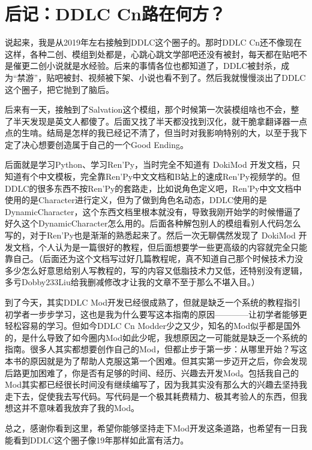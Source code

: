 \chapter{后记：DDLC Cn路在何方？}

说起来，我是从2019年左右接触到DDLC这个圈子的。那时DDLC Cn还不像现在这样，各种二创、模组到处都是，心跳心跳文学部吧还没有被封，每天都在贴吧不是催更二创小说就是水经验。后来的事情各位也都知道了，DDLC被封杀，成为“禁游”，贴吧被封、视频被下架、小说也看不到了。然后我就慢慢淡出了DDLC这个圈子，把它抛到了脑后。


后来有一天，接触到了Salvation这个模组，那个时候第一次装模组啥也不会，整了半天发现是英文人都傻了。后面又找了半天都没找到汉化，就干脆拿翻译器一点点的生啃。结局是怎样的我已经记不清了，但当时对我影响特别的大，以至于我下定了决心想要创造属于自己的一个Good Ending。


后面就是学习Python、学习Ren'Py，当时完全不知道有 DokiMod 开发文档，只知道有个中文模板，完全靠Ren'Py中文文档和B站上的速成Ren'Py视频学的。但DDLC的很多东西不按Ren'Py的套路走，比如说角色定义吧，Ren'Py中文文档中使用的是Character进行定义，但为了做到角色名动态，DDLC使用的是DynamicCharacter，这个东西文档里根本就没有，导致我刚开始学的时候懵逼了好久这个DynamicCharacter怎么用的。后面各种解包别人的模组看别人代码怎么写的，对于Ren'Py也是渐渐的熟悉起来了。然后一次无聊偶然发现了 DokiMod 开发文档，个人认为是一篇很好的教程，但后面想要学一些更高级的内容就完全只能靠自己。（后面还为这个文档写过好几篇教程呢，真不知道自己那个时候技术力没多少怎么好意思给别人写教程的，写的内容又低脂技术力又低，还特别没有逻辑，多亏Dobby233Liu给我删减修改才让我的文章不至于那么不堪入目。）


到了今天，其实DDLC Mod开发已经很成熟了，但就是缺乏一个系统的教程指引初学者一步步学习，这也是我为什么要写这本指南的原因————让初学者能够更轻松容易的学习。但如今DDLC Cn Modder少之又少，知名的Mod似乎都是国外的，是什么导致了如今圈内Mod如此少呢，我想原因之一可能就是缺乏一个系统的指南。很多人其实都想要创作自己的Mod，但都止步于第一步：从哪里开始？写这本书的原因就是为了帮助人克服这第一个困难。但其实第一步迈开之后，你会发现后路更加困难了，你是否有足够的时间、经历、兴趣去开发Mod。包括我自己的Mod其实都已经很长时间没有继续编写了，因为我其实没有那么大的兴趣去坚持我走下去，促使我去写代码。写代码是一个极其耗费精力、极其考验人的东西，但我想这并不意味着我放弃了我的Mod。

总之，感谢你看到这里，希望你能够坚持走下Mod开发这条道路，也希望有一日我能看到DDLC这个圈子像19年那样如此富有活力。